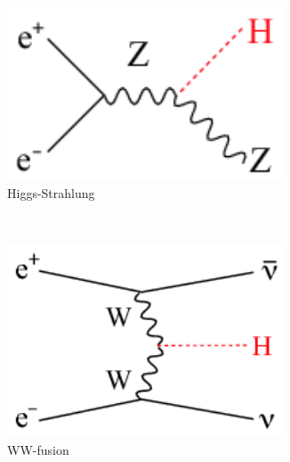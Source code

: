     \begin{figure}  
        \centering
        \begin{subfigure}[t]{0.3\textwidth}
            \includegraphics[width = 0.9\textwidth]{Pictures/Higgs/Chapter_Theory_figs_ZHdiagram.png}
            \caption{Higgs-Strahlung}
            \label{fig:higgsStrahlung}
        \end{subfigure}
        ~%
        \begin{subfigure}[t]{0.3\textwidth}
            \includegraphics[width = 0.9\textwidth]{Pictures/Higgs/Chapter_Theory_figs_nunuHdiagram.png}
            \caption{WW-fusion}
            \label{fig:WW-fusion}
        \end{subfigure}
        ~%
        \begin{subfigure}[t]{0.3\textwidth}

\end{subfigure}
\end{figure}
